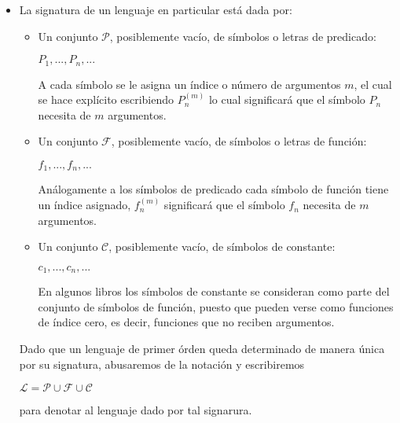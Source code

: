 \documentclass[letterpaper,11pt]{article}
\begin{document}
\begin{enumerate}
\begin{itemize}
\begin{itemize}
                \item La signatura de un lenguaje en particular está dada por:
                \begin{itemize}
                    \item Un conjunto $\mathcal{P}$, posiblemente vacío, de
                    símbolos o letras de predicado:
                    \begin{center}
                        $P_{1}, ..., P_{n}, ...$
                    \end{center}
                    A cada símbolo se le asigna un índice o número de argumentos 
                    $m$, el cual se hace explícito escribiendo $P_{n}^{(m)}$ lo 
                    cual significará que el símbolo $P_{n}$ necesita de $m$ 
                    argumentos.
                    \item Un conjunto $\mathcal{F}$, posiblemente vacío, de
                    símbolos o letras de función:
                    \begin{center}
                        $f_{1},..., f_{n},...$
                    \end{center}
                    Análogamente a los símbolos de predicado cada símbolo de 
                    función tiene un índice asignado, $f_{n}^{(m)}$ significará 
                    que el símbolo $f_{n}$ necesita de $m$ argumentos.       
                    \item Un conjunto $\mathcal{C}$, posiblemente vacío, de 
                    símbolos de constante:
                    \begin{center}
                        $c_{1}, ..., c_{n}, ...$
                    \end{center}      
                    En algunos libros los símbolos de constante se consideran 
                    como parte del conjunto de símbolos de función, puesto que 
                    pueden verse como funciones de índice cero, es decir, 
                    funciones que no reciben argumentos.
                \end{itemize}

                Dado que un lenguaje de primer órden queda determinado de manera única
                por su signatura, abusaremos de la notación y escribiremos
                \begin{center}
                    $\mathcal{L} = \mathcal{P} \cup \mathcal{F} \cup \mathcal{C}$
                \end{center}
                para denotar al lenguaje dado por tal signarura.
            \end{itemize}


\end{itemize}
\end{enumerate}
\end{document}
